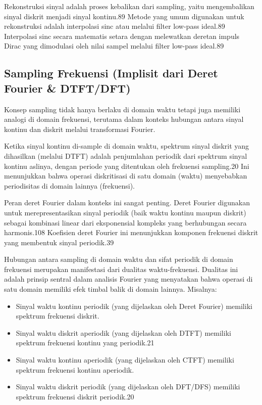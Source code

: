 \documentclass[
  letterpaper,
  DIV=11,
  numbers=noendperiod]{scrreprt}
\begin{document}
Rekonstruksi sinyal adalah proses kebalikan dari sampling, yaitu
mengembalikan sinyal diskrit menjadi sinyal kontinu.89 Metode yang umum
digunakan untuk rekonstruksi adalah interpolasi sinc atau melalui filter
low-pass ideal.89 Interpolasi sinc secara matematis setara dengan
melewatkan deretan impuls Dirac yang dimodulasi oleh nilai sampel
melalui filter low-pass ideal.89

\subsection{Sampling Frekuensi (Implisit dari Deret Fourier \&
DTFT/DFT)}\label{sampling-frekuensi-implisit-dari-deret-fourier-dtftdft}

Konsep sampling tidak hanya berlaku di domain waktu tetapi juga memiliki
analogi di domain frekuensi, terutama dalam konteks hubungan antara
sinyal kontinu dan diskrit melalui transformasi Fourier.

Ketika sinyal kontinu di-sample di domain waktu, spektrum sinyal diskrit
yang dihasilkan (melalui DTFT) adalah penjumlahan periodik dari spektrum
sinyal kontinu aslinya, dengan periode yang ditentukan oleh frekuensi
sampling.20 Ini menunjukkan bahwa operasi diskritisasi di satu domain
(waktu) menyebabkan periodisitas di domain lainnya (frekuensi).

Peran deret Fourier dalam konteks ini sangat penting. Deret Fourier
digunakan untuk merepresentasikan sinyal periodik (baik waktu kontinu
maupun diskrit) sebagai kombinasi linear dari eksponensial kompleks yang
berhubungan secara harmonis.108 Koefisien deret Fourier ini menunjukkan
komponen frekuensi diskrit yang membentuk sinyal periodik.39

Hubungan antara sampling di domain waktu dan sifat periodik di domain
frekuensi merupakan manifestasi dari dualitas waktu-frekuensi. Dualitas
ini adalah prinsip sentral dalam analisis Fourier yang menyatakan bahwa
operasi di satu domain memiliki efek timbal balik di domain lainnya.
Misalnya:

\begin{itemize}
\item
  Sinyal waktu kontinu periodik (yang dijelaskan oleh Deret Fourier)
  memiliki spektrum frekuensi diskrit.
\item
  Sinyal waktu diskrit aperiodik (yang dijelaskan oleh DTFT) memiliki
  spektrum frekuensi kontinu yang periodik.21
\item
  Sinyal waktu kontinu aperiodik (yang dijelaskan oleh CTFT) memiliki
  spektrum frekuensi kontinu aperiodik.
\item
  Sinyal waktu diskrit periodik (yang dijelaskan oleh DFT/DFS) memiliki
  spektrum frekuensi diskrit periodik.20
\end{itemize}
\end{document}
